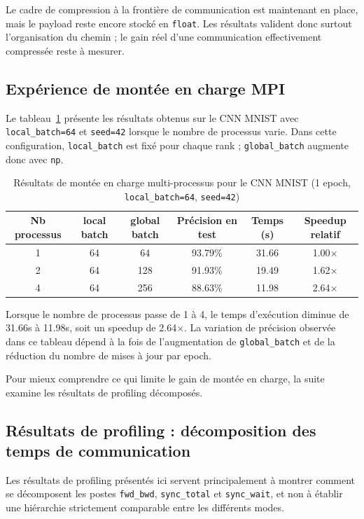 \documentclass[a4paper,11pt,oneside]{article}
\begin{document}
Le cadre de compression à la frontière de communication est maintenant en place, mais le payload reste encore stocké en \texttt{float}. Les résultats valident donc surtout l'organisation du chemin ; le gain réel d'une communication effectivement compressée reste à mesurer.

\subsection{Expérience de montée en charge MPI}

Le tableau~\ref{tab:mpi_scaling} présente les résultats obtenus sur le CNN MNIST avec \texttt{local\_batch=64} et \texttt{seed=42} lorsque le nombre de processus varie. Dans cette configuration, \texttt{local\_batch} est fixé pour chaque rank ; \texttt{global\_batch} augmente donc avec \texttt{np}.

\begin{table}[h]
\centering
\begin{tabular}{cccccc}
\hline
Nb processus & local batch & global batch & Précision en test & Temps (s) & Speedup relatif \\
\hline
1 & 64 & 64  & 93.79\% & 31.66 & 1.00$\times$ \\
2 & 64 & 128 & 91.93\% & 19.49 & 1.62$\times$ \\
4 & 64 & 256 & 88.63\% & 11.98 & 2.64$\times$ \\
\hline
\end{tabular}
\caption{Résultats de montée en charge multi-processus pour le CNN MNIST (1 epoch, \texttt{local\_batch=64}, \texttt{seed=42})}
\label{tab:mpi_scaling}
\end{table}

Lorsque le nombre de processus passe de 1 à 4, le temps d'exécution diminue de 31.66s à 11.98s, soit un speedup de 2.64$\times$. La variation de précision observée dans ce tableau dépend à la fois de l'augmentation de \texttt{global\_batch} et de la réduction du nombre de mises à jour par epoch.

Pour mieux comprendre ce qui limite le gain de montée en charge, la suite examine les résultats de profiling décomposés.

\subsection{Résultats de profiling : décomposition des temps de communication}

Les résultats de profiling présentés ici servent principalement à montrer comment se décomposent les postes \texttt{fwd\_bwd}, \texttt{sync\_total} et \texttt{sync\_wait}, et non à établir une hiérarchie strictement comparable entre les différents modes.
\end{document}
